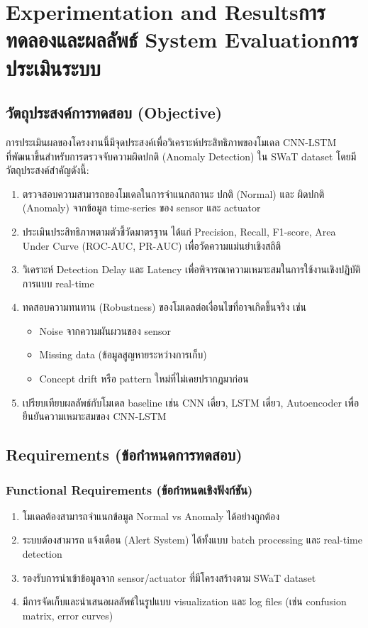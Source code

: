 \chapter{\ifproject%
\ifenglish Experimentation and Results\else การทดลองและผลลัพธ์\fi
\else%
\ifenglish System Evaluation\else การประเมินระบบ\fi
\fi}

\section{วัตถุประสงค์การทดสอบ (Objective)}
\hspace{2em} การประเมินผลของโครงงานนี้มีจุดประสงค์เพื่อวิเคราะห์ประสิทธิภาพของโมเดล CNN-LSTM \\ ที่พัฒนาขึ้นสำหรับการตรวจจับความผิดปกติ (Anomaly Detection) ใน SWaT dataset โดยมีวัตถุประสงค์สำคัญดังนี้:
\begin{enumerate}
    \item ตรวจสอบความสามารถของโมเดลในการจำแนกสถานะ ปกติ (Normal) และ ผิดปกติ (Anomaly) จากข้อมูล time-series ของ sensor และ actuator
    \item ประเมินประสิทธิภาพตามตัวชี้วัดมาตรฐาน ได้แก่ Precision, Recall, F1-score, Area Under Curve (ROC-AUC, PR-AUC) เพื่อวัดความแม่นยำเชิงสถิติ
    \item วิเคราะห์ Detection Delay และ Latency เพื่อพิจารณาความเหมาะสมในการใช้งานเชิงปฏิบัติการแบบ real-time
    \item ทดสอบความทนทาน (Robustness) ของโมเดลต่อเงื่อนไขที่อาจเกิดขึ้นจริง เช่น
    \begin{itemize}
        \item Noise จากความผันผวนของ sensor
        \item Missing data (ข้อมูลสูญหายระหว่างการเก็บ)
        \item Concept drift หรือ pattern ใหม่ที่ไม่เคยปรากฏมาก่อน
    \end{itemize}
    \item เปรียบเทียบผลลัพธ์กับโมเดล baseline เช่น CNN เดี่ยว, LSTM เดี่ยว, Autoencoder เพื่อยืนยันความเหมาะสมของ CNN-LSTM
\end{enumerate}

\section{Requirements (ข้อกำหนดการทดสอบ)}
\subsection{Functional Requirements (ข้อกำหนดเชิงฟังก์ชัน)}
\begin{enumerate}
    \item โมเดลต้องสามารถจำแนกข้อมูล Normal vs Anomaly ได้อย่างถูกต้อง
    \item ระบบต้องสามารถ แจ้งเตือน (Alert System) ได้ทั้งแบบ batch processing และ real-time detection
    \item รองรับการนำเข้าข้อมูลจาก sensor/actuator ที่มีโครงสร้างตาม SWaT dataset
    \item มีการจัดเก็บและนำเสนอผลลัพธ์ในรูปแบบ visualization และ log files (เช่น confusion matrix, error curves)
\end{enumerate}

